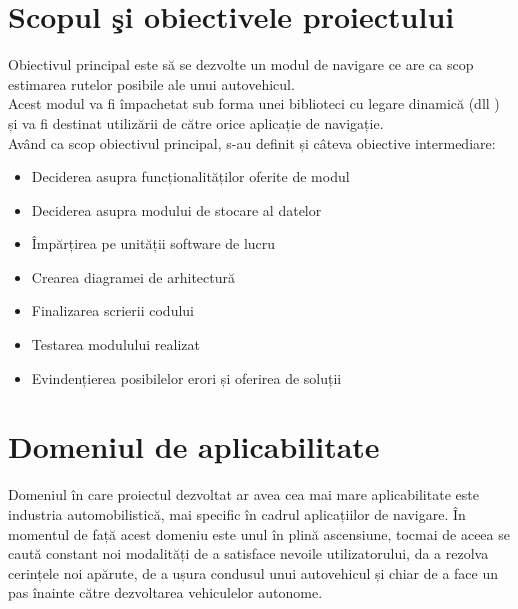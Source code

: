 \section{Scopul şi obiectivele proiectului} 
Obiectivul principal este să se dezvolte un modul de navigare ce are ca scop estimarea rutelor posibile ale unui autovehicul.
\vspace{6pt}
\\Acest modul va fi împachetat sub forma unei biblioteci cu legare dinamică (\acrshort{dll} ) și va fi destinat utilizării de către orice aplicație de navigație.
\vspace{6pt}
\\Având ca scop obiectivul principal, s-au definit și câteva obiective intermediare:

\begin{itemize}
 \setlength\itemsep{0em}
	\item Deciderea asupra funcționalităților oferite de modul
	\item Deciderea asupra modului de stocare al datelor
	\item Împărțirea pe unității software de lucru
	\item Crearea diagramei de arhitectură
	\item Finalizarea scrierii codului
	\item Testarea modulului realizat
	\item Evindențierea posibilelor erori și oferirea de soluții
\end{itemize}

\section{Domeniul de aplicabilitate} 
Domeniul în care proiectul dezvoltat ar avea cea mai mare aplicabilitate este industria automobilistică, mai specific în cadrul aplicațiilor de navigare. În momentul de față acest domeniu este unul în plină ascensiune, tocmai de aceea se caută constant noi modalități  de a satisface nevoile utilizatorului, da a rezolva cerințele noi apărute, de a ușura condusul unui autovehicul și chiar de a face un pas înainte către dezvoltarea vehiculelor autonome.

